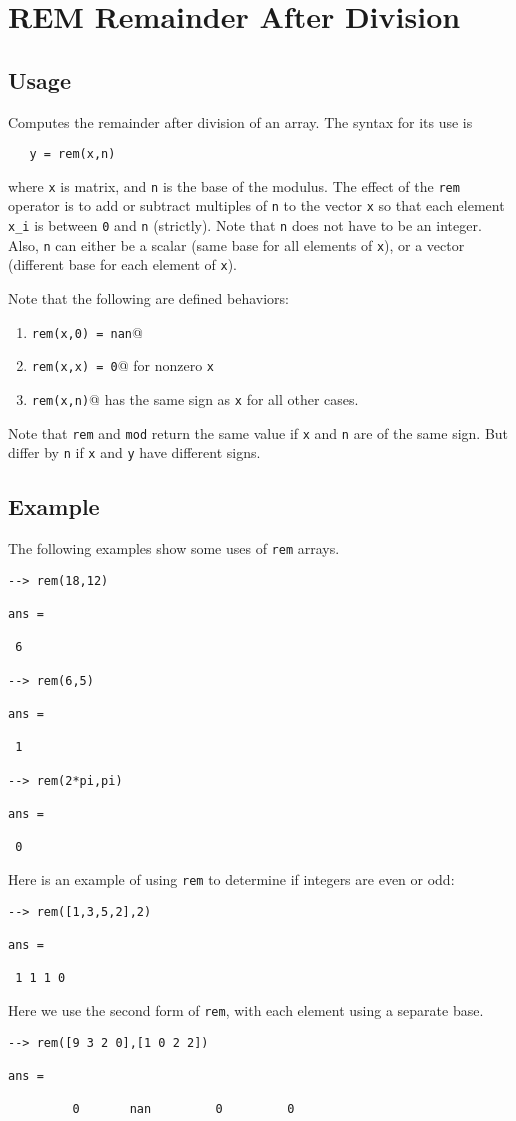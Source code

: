 \section{REM Remainder After Division}

\subsection{Usage}

Computes the remainder after division of an array.  The syntax for its use is
\begin{verbatim}
   y = rem(x,n)
\end{verbatim}
where \verb|x| is matrix, and \verb|n| is the base of the modulus.  The
effect of the \verb|rem| operator is to add or subtract multiples of \verb|n|
to the vector \verb|x| so that each element \verb|x_i| is between \verb|0| and \verb|n|
(strictly).  Note that \verb|n| does not have to be an integer.  Also,
\verb|n| can either be a scalar (same base for all elements of \verb|x|), or a
vector (different base for each element of \verb|x|).

Note that the following are defined behaviors:
\begin{enumerate}
\item  \verb|rem(x,0) = nan|@

\item  \verb|rem(x,x) = 0|@ for nonzero \verb|x|

\item  \verb|rem(x,n)|@ has the same sign as \verb|x| for all other cases.

\end{enumerate}
Note that \verb|rem| and \verb|mod| return the same value if \verb|x| and \verb|n|
are of the same sign.  But differ by \verb|n| if \verb|x| and \verb|y| have 
different signs.
\subsection{Example}

The following examples show some uses of \verb|rem|
arrays.
\begin{verbatim}
--> rem(18,12)

ans = 

 6 

--> rem(6,5)

ans = 

 1 

--> rem(2*pi,pi)

ans = 

 0 
\end{verbatim}
Here is an example of using \verb|rem| to determine if integers are even
 or odd:
\begin{verbatim}
--> rem([1,3,5,2],2)

ans = 

 1 1 1 0 
\end{verbatim}
Here we use the second form of \verb|rem|, with each element using a 
separate base.
\begin{verbatim}
--> rem([9 3 2 0],[1 0 2 2])

ans = 

         0       nan         0         0 
\end{verbatim}
